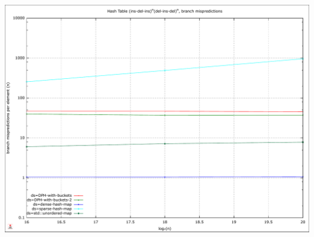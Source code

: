 \documentclass{article}
\begin{document}
\includegraphics[width=\linewidth]{img/hash_ins-del-cycle_branchmiss}
\raggedright
\end{document}
